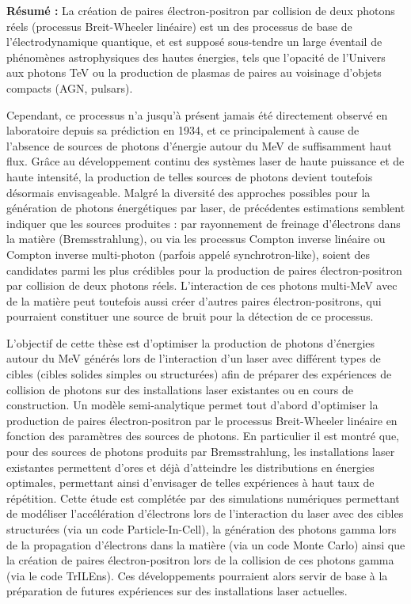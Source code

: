 \documentclass[11pt]{book}
\begin{document}
\vspace{.3cm}

\noindent\textbf{Résumé :} La création de paires électron-positron par collision de deux photons réels (processus Breit-Wheeler linéaire) est un des processus de base de l'électrodynamique quantique, et est supposé sous-tendre un large éventail de phénomènes astrophysiques des hautes énergies, tels que l'opacité de l'Univers aux photons TeV ou la production de plasmas de paires au voisinage d'objets compacts (AGN, pulsars). 

\vspace{.1cm}

\noindent Cependant, ce processus n'a jusqu'à présent jamais été directement observé en laboratoire depuis sa prédiction en 1934, et ce principalement à cause de l'absence de sources de photons d'énergie autour du MeV de suffisamment haut flux. Grâce au développement continu des systèmes laser de haute puissance et de haute intensité, la production de telles sources de photons devient toutefois désormais envisageable. Malgré la diversité des approches possibles pour la génération de photons énergétiques par laser, de précédentes estimations semblent indiquer que les sources produites : par rayonnement de freinage d'électrons dans la matière (Bremsstrahlung), ou via les processus Compton inverse linéaire ou Compton inverse multi-photon (parfois appelé synchrotron-like), soient des candidates parmi les plus crédibles pour la production de paires électron-positron par collision de deux photons réels. L'interaction de ces photons multi-MeV avec de la matière peut toutefois aussi créer d'autres paires électron-positrons, qui pourraient constituer une source de bruit pour la détection de ce processus. 

\vspace{.1cm}

\noindent L'objectif de cette thèse est d'optimiser la production de photons d'énergies autour du MeV générés lors de l'interaction d'un laser avec différent types de cibles (cibles solides simples ou structurées) afin de préparer des expériences de collision de photons sur des installations laser existantes ou en cours de construction. 
Un modèle semi-analytique permet tout d'abord d'optimiser la production de paires électron-positron par le processus Breit-Wheeler linéaire en fonction des paramètres des sources de photons. En particulier il est montré que, pour des sources de photons produits par Bremsstrahlung, les installations laser existantes permettent d'ores et déjà d'atteindre les distributions en énergies optimales, permettant ainsi d'envisager de telles expériences à haut taux de répétition. 
Cette étude est complétée par des simulations numériques permettant de modéliser l'accélération d'électrons lors de l'interaction du laser avec des cibles structurées (via un code Particle-In-Cell), la génération des photons gamma lors de la propagation d'électrons dans la matière (via un code Monte Carlo) ainsi que la création de paires électron-positron lors de la collision de ces photons gamma (via le code TrILEns). 
Ces développements pourraient alors servir de base à la préparation de futures expériences sur des installations laser actuelles.
\end{document}
